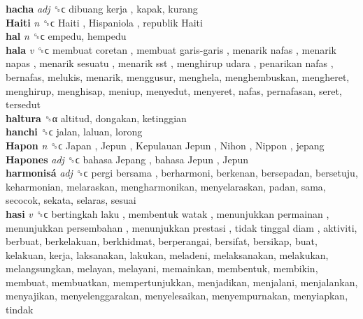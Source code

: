 \textbf{hacha} \emph{adj}  ␝ϲ   dibuang kerja , kapak, kurang  \\
\textbf{Haiti} \emph{n}  ␝ϲ   Haiti ,  Hispaniola ,  republik Haiti   \\
\textbf{hal} \emph{n}  ␝ϲ  empedu, hempedu  \\
\textbf{hala} \emph{v}  ␝ϲ   membuat coretan ,  membuat garis-garis ,  menarik nafas ,  menarik napas ,  menarik sesuatu ,  menarik sst ,  menghirup udara ,  penarikan nafas , bernafas, melukis, menarik, menggusur, menghela, menghembuskan, mengheret, menghirup, menghisap, meniup, menyedut, menyeret, nafas, pernafasan, seret, tersedut  \\
\textbf{haltura} ␝α  altitud, dongakan, ketinggian  \\
\textbf{hanchi} ␝ϲ  jalan, laluan, lorong  \\
\textbf{Hapon} \emph{n}  ␝ϲ   Japan ,  Jepun ,  Kepulauan Jepun ,  Nihon ,  Nippon , jepang  \\
\textbf{Hapones} \emph{adj}  ␝ϲ   bahasa Jepang ,  bahasa Jepun ,  Jepun   \\
\textbf{harmonisá} \emph{adj}  ␝ϲ   pergi bersama , berharmoni, berkenan, bersepadan, bersetuju, keharmonian, melaraskan, mengharmonikan, menyelaraskan, padan, sama, secocok, sekata, selaras, sesuai  \\
\textbf{hasi} \emph{v}  ␝ϲ   bertingkah laku ,  membentuk watak ,  menunjukkan permainan ,  menunjukkan persembahan ,  menunjukkan prestasi ,  tidak tinggal diam , aktiviti, berbuat, berkelakuan, berkhidmat, berperangai, bersifat, bersikap, buat, kelakuan, kerja, laksanakan, lakukan, meladeni, melaksanakan, melakukan, melangsungkan, melayan, melayani, memainkan, membentuk, membikin, membuat, membuatkan, mempertunjukkan, menjadikan, menjalani, menjalankan, menyajikan, menyelenggarakan, menyelesaikan, menyempurnakan, menyiapkan, tindak  \\
